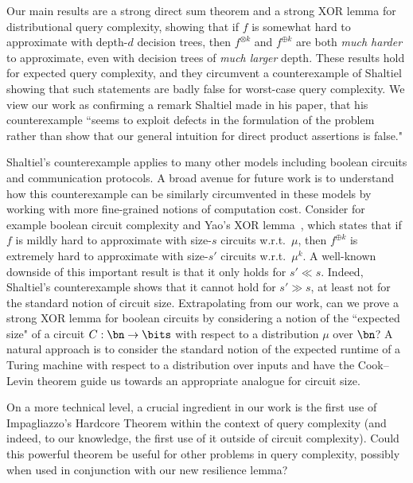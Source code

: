 Our main results are a strong direct sum theorem and a strong XOR lemma for distributional query complexity, showing that if $f$ is somewhat hard to approximate with depth-$d$ decision trees, then $f^{\otimes k}$ and $f^{\oplus k}$ are both {\sl much harder} to approximate, even with decision trees of {\sl much larger} depth.  These results hold for expected query complexity, and they circumvent a counterexample of Shaltiel showing that such statements are badly false for worst-case query complexity.  We view our work as confirming a remark Shaltiel made in his paper, that his counterexample ``seems to exploit defects in the formulation of the problem rather than show that our general intuition for direct product assertions is false."


Shaltiel's counterexample applies to  
 many other models including boolean circuits and communication protocols. A broad avenue for future work is to understand how this counterexample can be similarly circumvented in these models by working with more fine-grained notions of computation cost.  Consider for example boolean circuit complexity and Yao's XOR lemma~\cite{Yao82}, which states that if $f$ is mildly hard to approximate with size-$s$ circuits w.r.t.~$\mu$, then $f^{\oplus k}$ is extremely hard to approximate with size-$s'$ circuits w.r.t.~$\mu^{k}$.  A well-known downside of this important result is that it only holds for $s'\ll s$. Indeed, Shaltiel's counterexample shows that it cannot hold for $s' \gg s$, at least not for the standard notion of circuit size. Extrapolating from our work, can we prove a strong XOR lemma for boolean circuits by considering a notion of the ``expected size" of a circuit $C : \bn \to \bits$ with respect to a distribution $\mu$ over $\bn$?  A natural approach is to consider the standard notion of the expected runtime of a Turing machine with respect to a distribution over inputs and have the Cook--Levin theorem guide us towards an appropriate analogue for circuit size. 



On a more technical level, a crucial ingredient in our work is the first use of Impagliazzo's Hardcore Theorem within the context of query complexity (and indeed, to our knowledge, the first use of it outside of circuit complexity). Could this powerful theorem be useful for other problems in query complexity, possibly when used in conjunction with our new resilience lemma?
